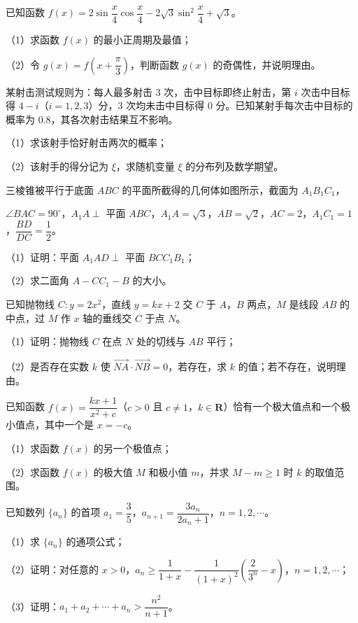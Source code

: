 \begin{question}
已知函数 $f(x)=2\sin\dfrac x4\cos\dfrac x4-2\sqrt3\sin^2\dfrac x4+\sqrt3$。

（1）求函数 $f(x)$ 的最小正周期及最值；

（2）令 $g(x)=f\left(x+\dfrac{\pi}3\right)$，判断函数 $g(x)$ 的奇偶性，并说明理由。

\end{question}
\begin{question}
某射击测试规则为：每人最多射击 $3$ 次，击中目标即终止射击，第 $i$ 次击中目标得 $4-i$（$i=1,2,3$）分，$3$ 次均未击中目标得 $0$ 分。已知某射手每次击中目标的概率为 $0.8$，其各次射击结果互不影响。

（1）求该射手恰好射击两次的概率；

（2）该射手的得分记为 $\xi$，求随机变量 $\xi$ 的分布列及数学期望。

\Needspace{0.4\textheight}
\end{question}
\begin{question}
三棱锥被平行于底面 $ABC$ 的平面所截得的几何体如图所示，截面为 $A_1B_1C_1$，

$\angle BAC=90^\circ$，$A_1A\perp$ 平面 $ABC$，$A_1A=\sqrt3$，$AB=\sqrt2$，$AC=2$，$A_1C_1=1$，$\dfrac{BD}{DC}=\dfrac12$。

（1）证明：平面 $A_1AD\perp$ 平面 $BCC_1B_1$；

（2）求二面角 $A-CC_1-B$ 的大小。
\nopagebreak[4]
\begin{center}\end{center}
\nopagebreak[4]
\end{question}
\begin{question}
已知抛物线 $C:y=2x^2$，直线 $y=kx+2$ 交 $C$ 于 $A$，$B$ 两点，$M$ 是线段 $AB$ 的中点，过 $M$ 作 $x$ 轴的垂线交 $C$ 于点 $N$。

（1）证明：抛物线 $C$ 在点 $N$ 处的切线与 $AB$ 平行；

（2）是否存在实数 $k$ 使 $\overrightarrow{NA}\cdot\overrightarrow{NB}=0$，若存在，求 $k$ 的值；若不存在，说明理由。

\end{question}
\begin{question}
已知函数 $f(x)=\dfrac{kx+1}{x^2+c}$（$c>0$ 且 $c\neq1$，$k\in\mathbf R$）恰有一个极大值点和一个极小值点，其中一个是 $x=-c$。

（1）求函数 $f(x)$ 的另一个极值点；

（2）求函数 $f(x)$ 的极大值 $M$ 和极小值 $m$，并求 $M-m\geqslant1$ 时 $k$ 的取值范围。

\end{question}
\begin{question}
已知数列 $\{a_n\}$ 的首项 $a_1=\dfrac35$，$a_{n+1}=\dfrac{3a_n}{2a_n+1}$，$n=1,2,\cdots$。

（1）求 $\{a_n\}$ 的通项公式；

（2）证明：对任意的 $x>0$，$a_n\geqslant\dfrac1{1+x}-\dfrac1{(1+x)^2}\left(\dfrac2{3^n}-x\right)$，$n=1,2,\cdots$；

（3）证明：$a_1+a_2+\cdots+a_n>\dfrac{n^2}{n+1}$。

\end{question}